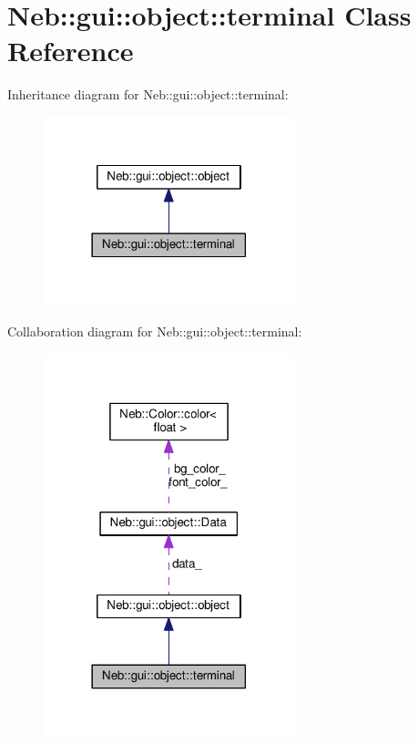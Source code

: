 \hypertarget{classNeb_1_1gui_1_1object_1_1terminal}{\section{Neb\-:\-:gui\-:\-:object\-:\-:terminal Class Reference}
\label{classNeb_1_1gui_1_1object_1_1terminal}
}


Inheritance diagram for Neb\-:\-:gui\-:\-:object\-:\-:terminal\-:
\nopagebreak
\begin{figure}[H]
\begin{center}
\leavevmode
\includegraphics[width=206pt]{classNeb_1_1gui_1_1object_1_1terminal__inherit__graph}
\end{center}
\end{figure}


Collaboration diagram for Neb\-:\-:gui\-:\-:object\-:\-:terminal\-:
\nopagebreak
\begin{figure}[H]
\begin{center}
\leavevmode
\includegraphics[width=206pt]{classNeb_1_1gui_1_1object_1_1terminal__coll__graph}
\end{center}
\end{figure}
